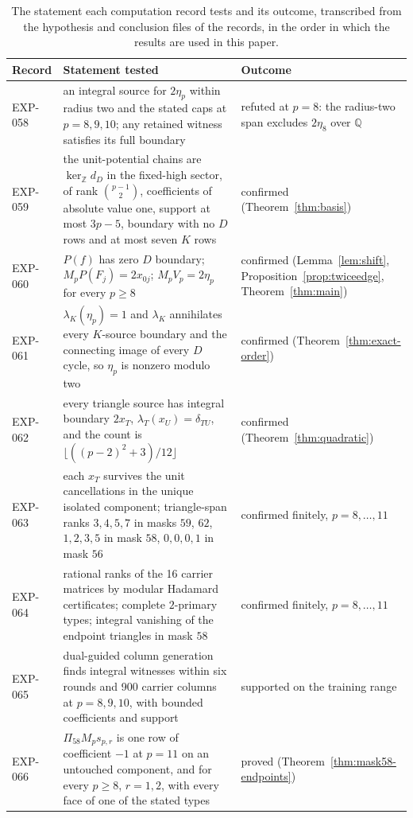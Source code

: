 \documentclass[11pt]{article}
\theoremstyle{definition}
\theoremstyle{remark}
\newcommand{\Z}{\mathbb Z}
\begin{document}
\begin{table}[t]
\centering\scriptsize
\begin{tabular}{>{\raggedright\arraybackslash}p{}>{\raggedright\arraybackslash}p{}>{\raggedright\arraybackslash}p{}}
\toprule
Record & Statement tested & Outcome\\
\midrule
EXP-058 & an integral source for $2\eta_p$ within radius two and the stated caps at $p=8,9,10$; any retained witness satisfies its full boundary & refuted at $p=8$: the radius-two span excludes $2\eta_8$ over $\mathbb Q$\\[2pt]
EXP-059 & the unit-potential chains are $\ker_{\Z}d_D$ in the fixed-high sector, of rank $\binom{p-1}{2}$, coefficients of absolute value one, support at most $3p-5$, boundary with no $D$ rows and at most seven $K$ rows & confirmed (Theorem~\ref{thm:basis})\\[2pt]
EXP-060 & $P(f)$ has zero $D$ boundary; $M_pP(F_j)=2x_{0j}$; $M_pV_p=2\eta_p$ for every $p\geq8$ & confirmed (Lemma~\ref{lem:shift}, Proposition~\ref{prop:twiceedge}, Theorem~\ref{thm:main})\\[2pt]
EXP-061 & $\lambda_K(\eta_p)=1$ and $\lambda_K$ annihilates every $K$-source boundary and the connecting image of every $D$ cycle, so $\eta_p$ is nonzero modulo two & confirmed (Theorem~\ref{thm:exact-order})\\[2pt]
EXP-062 & every triangle source has integral boundary $2x_T$, $\lambda_T(x_U)=\delta_{TU}$, and the count is $\lfloor((p-2)^2+3)/12\rfloor$ & confirmed (Theorem~\ref{thm:quadratic})\\[2pt]
EXP-063 & each $x_T$ survives the unit cancellations in the unique isolated component; triangle-span ranks $3,4,5,7$ in masks $59$, $62$, $1,2,3,5$ in mask $58$, $0,0,0,1$ in mask $56$ & confirmed finitely, $p=8,\ldots,11$\\[2pt]
EXP-064 & rational ranks of the 16 carrier matrices by modular Hadamard certificates; complete $2$-primary types; integral vanishing of the endpoint triangles in mask $58$ & confirmed finitely, $p=8,\ldots,11$\\[2pt]
EXP-065 & dual-guided column generation finds integral witnesses within six rounds and 900 carrier columns at $p=8,9,10$, with bounded coefficients and support & supported on the training range\\[2pt]
EXP-066 & $\Pi_{58}M_ps_{p,r}$ is one row of coefficient $-1$ at $p=11$ on an untouched component, and for every $p\geq8$, $r=1,2$, with every face of one of the stated types & proved (Theorem~\ref{thm:mask58-endpoints})\\
\bottomrule
\end{tabular}
\caption{The statement each computation record tests and its outcome, transcribed from the hypothesis and conclusion files of the records, in the order in which the results are used in this paper.}
\label{tab:hypotheses}
\end{table}
\end{document}
